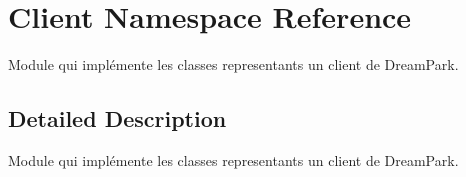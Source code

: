 \hypertarget{namespace_client}{}\section{Client Namespace Reference}
\label{namespace_client}


Module qui implémente les classes representants un client de Dream\+Park.  




\subsection{Detailed Description}
Module qui implémente les classes representants un client de Dream\+Park. 

